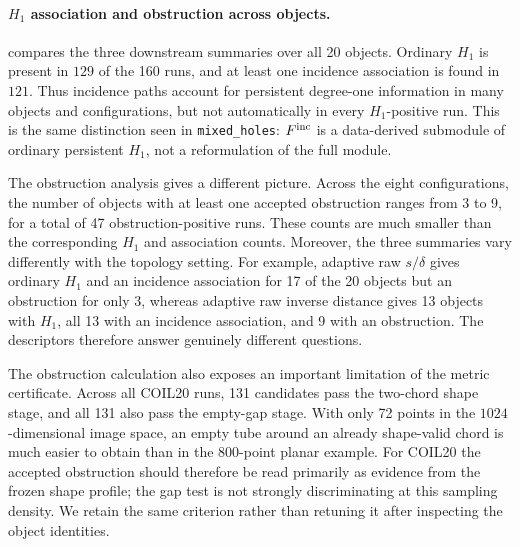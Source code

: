 \documentclass[a4paper,11pt]{article}
\theoremstyle{definition}
\theoremstyle{remark}
\begin{document}
\paragraph{$H_1$ association and obstruction across objects.}
 compares the three downstream summaries over all 20 objects. Ordinary $H_1$ is present in $129$ of the 160 runs, and at least one incidence association is found in $121$. Thus incidence paths account for persistent degree-one information in many objects and configurations, but not automatically in every $H_1$-positive run. This is the same distinction seen in \texttt{mixed\_holes}: $F^{\rm inc}$ is a data-derived submodule of ordinary persistent $H_1$, not a reformulation of the full module.

The obstruction analysis gives a different picture. Across the eight configurations, the number of objects with at least one accepted obstruction ranges from 3 to 9, for a total of 47 obstruction-positive runs.  These counts are much smaller than the corresponding $H_1$ and association counts.  Moreover, the three summaries vary differently with the topology setting. For example, adaptive raw $s/\delta$ gives ordinary $H_1$ and an incidence association for 17 of the 20 objects but an obstruction for only 3, whereas adaptive raw inverse distance gives 13 objects with $H_1$, all 13 with an incidence association, and 9 with an obstruction. The descriptors therefore answer genuinely different questions.

The obstruction calculation also exposes an important limitation of the metric certificate. Across all COIL20 runs, 131 candidates pass the two-chord shape stage, and all 131 also pass the empty-gap stage. With only 72 points in the $1024$-dimensional image space, an empty tube around an already shape-valid chord is much easier to obtain than in the 800-point planar example. For COIL20 the accepted obstruction should therefore be read primarily as evidence from the frozen shape profile; the gap test is not strongly discriminating at this sampling density. We retain the same criterion rather than retuning it after inspecting the object identities.
\end{document}
